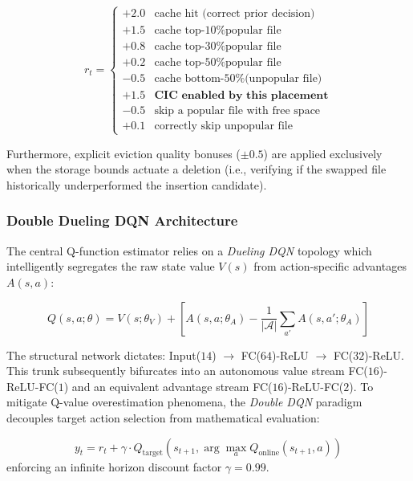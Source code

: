 \documentclass[12pt,a4paper]{article}
\begin{document}
\begin{equation}
r_t =
\begin{cases}
+2.0 & \text{cache hit (correct prior decision)} \\
+1.5 & \text{cache top-10\% popular file} \\
+0.8 & \text{cache top-30\% popular file} \\
+0.2 & \text{cache top-50\% popular file} \\
-0.5 & \text{cache bottom-50\% (unpopular file)} \\
+1.5 & \textbf{CIC enabled by this placement} \\
-0.5 & \text{skip a popular file with free space} \\
+0.1 & \text{correctly skip unpopular file}
\end{cases}
\label{eq:reward}
\end{equation}

Furthermore, explicit eviction quality bonuses ($\pm 0.5$) are applied exclusively when the storage bounds actuate a deletion (i.e., verifying if the swapped file historically underperformed the insertion candidate).

\subsubsection{Double Dueling DQN Architecture}
The central Q-function estimator relies on a \textit{Dueling DQN} topology \cite{b_wang_dueling} which intelligently segregates the raw state value $V(s)$ from action-specific advantages $A(s, a)$:

\begin{equation}
Q(s, a; \theta) = V(s; \theta_V) + \left[ A(s, a; \theta_A) - \frac{1}{|\mathcal{A}|}\sum_{a'} A(s, a'; \theta_A) \right]
\label{eq:dueling}
\end{equation}

The structural network dictates: Input($14$) $\rightarrow$ FC($64$)-ReLU $\rightarrow$ FC($32$)-ReLU. This trunk subsequently bifurcates into an autonomous value stream FC($16$)-ReLU-FC($1$) and an equivalent advantage stream FC($16$)-ReLU-FC($2$). To mitigate Q-value overestimation phenomena, the \textit{Double DQN} paradigm \cite{b_van_hasselt} decouples target action selection from mathematical evaluation:

\begin{equation}
y_t = r_t + \gamma \cdot Q_{\text{target}}\!\left(s_{t+1}, \arg\max_{a} Q_{\text{online}}(s_{t+1}, a)\right)
\label{eq:ddqn}
\end{equation}
enforcing an infinite horizon discount factor $\gamma = 0.99$.
\end{document}
